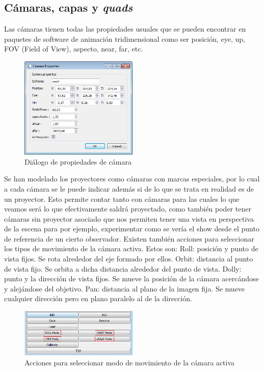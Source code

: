\subsection{Cámaras, capas y \emph{quads}}
Las cámaras tienen todas las propiedades usuales que se pueden encontrar en paquetes de software de animación tridimensional como ser posición, eye, up, FOV (Field of View), aspecto, near, far, etc.

\begin{figure}[H]
  \centering
    \includegraphics[width=0.5\textwidth]{./Cap5_vmt/vmt_cameraProperties.png}
  \caption{Diálogo de propiedades de cámara}
  \label{fig:VMT-CameraProperties}
\end{figure}

Se han modelado los proyectores como cámaras con marcas especiales, por lo cual a cada cámara se le puede indicar además si de lo que se trata en realidad es de un proyector. Esto permite contar tanto con cámaras para las cuales lo que veamos será lo que efectivamente saldrá proyectado, como también poder tener cámaras sin proyector asociado que nos permiten tener una vista en perspectiva de la escena para por ejemplo, experimentar como se vería el show desde el punto de referencia de un cierto observador.
Existen también acciones para seleccionar los tipos de movimiento de la cámara activa. Estos son:
Roll: posición y punto de vista fijos. Se rota alrededor del eje formado por ellos.
Orbit: distancia al punto de vista fijo. Se orbita a dicha distancia alrededor del punto de vista.
Dolly: punto y la dirección de vista fijos. Se mueve la posición de la cámara acercándose y alejándose del objetivo.
Pan: distancia al plano de la imagen fija. Se mueve cualquier dirección pero en plano paralelo al de la dirección.

\begin{figure}[H]
  \centering
    \includegraphics[width=0.5\textwidth]{./Cap5_vmt/vmt_SceneBotonera.png}
  \caption{Acciones para seleccionar modo de movimiento de la cámara activa}
  \label{fig:VMT-CameraActions}
\end{figure}

